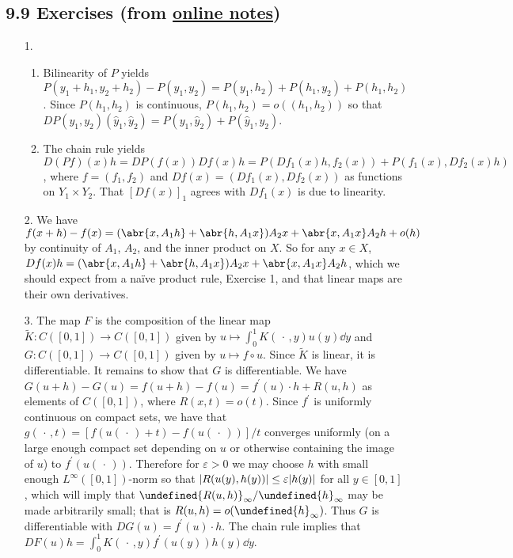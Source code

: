 \documentclass[11pt,leqno]{article}
\theoremstyle{plain}
\theoremstyle{definition}
\numberwithin{equation}{section}
\numberwithin{lem}{section}
\let\norm\undefined %
\DeclarePairedDelimiter\norm{\lVert}{\rVert}
\begin{document}
\subsection*{9.9 Exercises (from \href{https://users.oden.utexas.edu/~arbogast/appMath08c.pdf}{online notes})}
\begin{enumerate}
    \item[1.] 
    \begin{enumerate}
        \item Bilinearity of $P$ yields $P(y_1+h_1, y_2 + h_2) - P(y_1,y_2) = P(y_1,h_2) + P(h_1,y_2) + P(h_1,h_2)$. Since $P(h_1,h_2)$ is continuous, $P(h_1,h_2) = o((h_1,h_2))$ so that $DP(y_1,y_2)(\hat y_1,\hat y_2) = P(y_1,\hat y_2) + P(\hat y_1,y_2)$.
        \item The chain rule yields $D(Pf)(x)h = DP(f(x))Df(x)h = P(Df_1(x)h, f_2(x)) + P(f_1(x),Df_2(x)h)$, where $f = (f_1,f_2)$ and $Df(x) = (Df_1(x),Df_2(x))$ as functions on $Y_1\times Y_2$. That $[Df(x)]_1$ agrees with $Df_1(x)$ is due to linearity.
    \end{enumerate}
    \item[2.] We have $f(x+h) - f(x) = (\abr{x,A_1h} + \abr{h,A_1x})A_2x + \abr{x,A_1x}A_2h + o(h)$ by continuity of $A_1$, $A_2$, and the inner product on $X$. So for any $x\in X$, $Df(x)h = (\abr{x,A_1h} + \abr{h,A_1x})A_2x + \abr{x,A_1x}A_2h$, which we should expect from a na\"ive product rule, Exercise 1, and that linear maps are their own derivatives.
    \item[3.] The map $F$ is the composition of the linear map $\tilde K\colon C([0,1])\to C([0,1])$ given by $u\mapsto \int_0^1K(\,\cdot\,,y)u(y)\dd y$ and $G\colon C([0,1])\to C([0,1])$ given by $u\mapsto f\circ u$. Since $\tilde K$ is linear, it is differentiable. It remains to show that $G$ is differentiable. We have $G(u+h) - G(u) = f(u+h) - f(u) = f^\prime(u)\cdot h + R(u,h)$ as elements of $C([0,1])$, where $R(x,t)= o(t)$. Since $f^\prime$ is uniformly continuous on compact sets, we have that $g(\,\cdot\,,t) = [f(u(\,\cdot\,) + t) - f(u(\,\cdot\,))]/t$ converges uniformly (on a large enough compact set depending on $u$ or otherwise containing the image of $u$) to $f^\prime(u(\,\cdot\,))$. Therefore for $\varepsilon>0$ we may choose $h$ with small enough $L^\infty([0,1])$-norm so that $\abs{R(u(y),h(y))}\leq \varepsilon\abs{h(y)}$ for all $y\in [0,1]$, which will imply that $\norm{R(u,h)}_\infty/\norm{h}_\infty$ may be made arbitrarily small; that is $R(u,h) = o(\norm{h}_\infty)$. Thus $G$ is differentiable with $DG(u) = f^\prime(u)\cdot h$. The chain rule implies that $DF(u)h = \int_0^1K(\,\cdot\,,y)f^\prime(u(y))h(y)\dd y$.

\end{enumerate}
\end{document}
